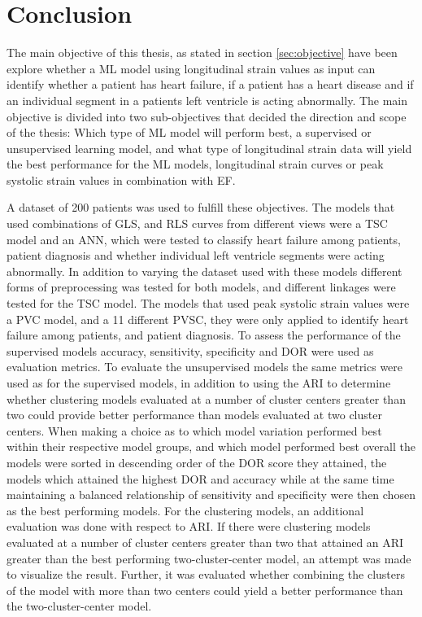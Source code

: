 \chapter{Conclusion}

The main objective of this thesis, as stated in section \ref{sec:objective} have been explore whether a ML model using longitudinal strain values as input can identify whether a patient has heart failure, if a patient has a heart disease and if an individual segment in a patients left ventricle is acting abnormally. The main objective is divided into two sub-objectives that decided the direction and scope of the thesis: Which type of ML model will perform best, a supervised or unsupervised learning model, and what type of longitudinal strain data will yield the best performance for the ML models, longitudinal strain curves or peak systolic strain values in combination with EF. \bigskip

A dataset of 200 patients was used to fulfill these objectives. The models that used combinations of GLS, and RLS curves from different views were a TSC model and an ANN, which were tested to classify heart failure among patients, patient diagnosis and whether individual left ventricle segments were acting abnormally. In addition to varying the dataset used with these models different forms of preprocessing was tested for both models, and different linkages were tested for the TSC model. The models that used peak systolic strain values were a PVC model, and a 11 different PVSC, they were only applied to identify heart failure among patients, and patient diagnosis. To assess the performance of the supervised models accuracy, sensitivity, specificity and DOR were used as evaluation metrics. To evaluate the unsupervised models the same metrics were used as for the supervised models, in addition to using the ARI to determine whether clustering models evaluated at a number of cluster centers greater than two could provide better performance than models evaluated at two cluster centers. When making a choice as to which model variation performed best within their respective model groups, and which model performed best overall the models were sorted in descending order of the DOR score they attained, the models which attained the highest DOR and accuracy while at the same time maintaining a balanced relationship of sensitivity and specificity were then chosen as the best performing models. For the clustering models, an additional evaluation was done with respect to ARI. If there were clustering models evaluated at a number of cluster centers greater than two that attained an ARI greater than the best performing two-cluster-center model, an attempt was made to visualize the result. Further, it was evaluated whether combining the clusters of the model with more than two centers could yield a better performance than the two-cluster-center model. \bigskip

